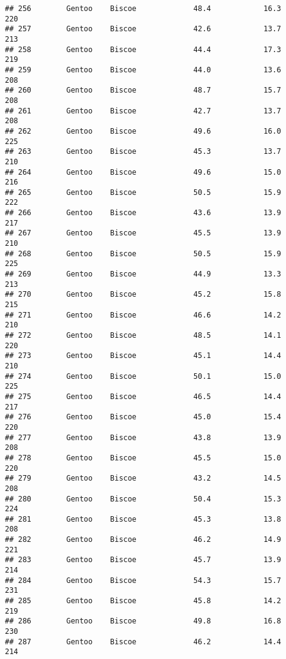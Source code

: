 \documentclass[
]{article}
\begin{document}
\begin{verbatim}
## 256        Gentoo    Biscoe             48.4            16.3               220
## 257        Gentoo    Biscoe             42.6            13.7               213
## 258        Gentoo    Biscoe             44.4            17.3               219
## 259        Gentoo    Biscoe             44.0            13.6               208
## 260        Gentoo    Biscoe             48.7            15.7               208
## 261        Gentoo    Biscoe             42.7            13.7               208
## 262        Gentoo    Biscoe             49.6            16.0               225
## 263        Gentoo    Biscoe             45.3            13.7               210
## 264        Gentoo    Biscoe             49.6            15.0               216
## 265        Gentoo    Biscoe             50.5            15.9               222
## 266        Gentoo    Biscoe             43.6            13.9               217
## 267        Gentoo    Biscoe             45.5            13.9               210
## 268        Gentoo    Biscoe             50.5            15.9               225
## 269        Gentoo    Biscoe             44.9            13.3               213
## 270        Gentoo    Biscoe             45.2            15.8               215
## 271        Gentoo    Biscoe             46.6            14.2               210
## 272        Gentoo    Biscoe             48.5            14.1               220
## 273        Gentoo    Biscoe             45.1            14.4               210
## 274        Gentoo    Biscoe             50.1            15.0               225
## 275        Gentoo    Biscoe             46.5            14.4               217
## 276        Gentoo    Biscoe             45.0            15.4               220
## 277        Gentoo    Biscoe             43.8            13.9               208
## 278        Gentoo    Biscoe             45.5            15.0               220
## 279        Gentoo    Biscoe             43.2            14.5               208
## 280        Gentoo    Biscoe             50.4            15.3               224
## 281        Gentoo    Biscoe             45.3            13.8               208
## 282        Gentoo    Biscoe             46.2            14.9               221
## 283        Gentoo    Biscoe             45.7            13.9               214
## 284        Gentoo    Biscoe             54.3            15.7               231
## 285        Gentoo    Biscoe             45.8            14.2               219
## 286        Gentoo    Biscoe             49.8            16.8               230
## 287        Gentoo    Biscoe             46.2            14.4               214

\end{verbatim}
\end{document}
